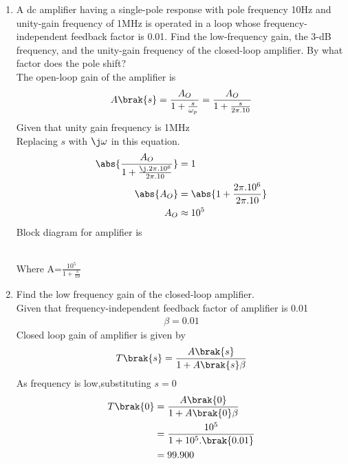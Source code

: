 \begin{enumerate}[label=\thesubsection.\arabic*.,ref=\thesubsection.\theenumi]

\item A dc amplifier having a single-pole response with pole frequency 10Hz and unity-gain frequency of 1MHz is operated in a loop whose frequency-independent feedback factor is 0.01. Find the low-frequency gain, the 3-dB frequency, and the unity-gain frequency of the closed-loop amplifier. By what factor does the pole shift?\\
\solution The open-loop gain of the amplifier is\\
\begin{align}
    A\brak{s}=\frac{A_{O}}{1+\frac{s}{\omega_p}}=\frac{A_{O}}{1+\frac{s}{2\pi.10}}
\end{align}
Given that unity gain frequency is 1MHz\\
Replacing $s$ with $\j\omega$ in this equation.
\begin{align}
    \abs{\frac{A_{O}}{1+\frac{\j.2\pi.10^6}{2\pi.10}}}&=1\\
    \abs{A_{O}}&=\abs{1+\frac{2\pi.10^6}{2\pi.10}}\\
    A_{O}&\approx10^5
\end{align}
Block diagram for amplifier is
\begin{figure}[!ht]
    \begin{center}
		\resizebox{\columnwidth}{!}{}
	\end{center}
\caption{}
\label{fig:ee18btech11035_block}
\end{figure}\\
Where A=$\frac{10^5}{1+\frac{s}{10}}$

\item Find the low frequency gain of the closed-loop amplifier.\\ 
\solution Given that frequency-independent feedback factor of amplifier is 0.01\\
\begin{align}
    \beta=0.01
\end{align}
Closed loop gain of amplifier is given by
\begin{align}
    \label{eq:ee18btech11035_T}
    T\brak{s}=\frac{A\brak{s}}{1+A\brak{s}\beta}
\end{align}
As frequency is low,substituting $s=0$\\
\begin{align}
    T\brak{0}&=\frac{A\brak{0}}{1+A\brak{0}\beta}\\
    &=\frac{10^5}{1+10^5.\brak{0.01}}\\
    &=99.900
\end{align}


\end{enumerate}
